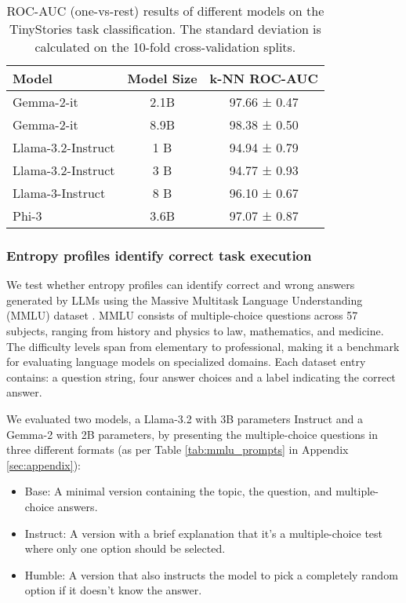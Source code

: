 \begin{table}[ht]
\centering
\caption{ROC-AUC (one-vs-rest) results of different models on the TinyStories task classification. The standard deviation is calculated on the 10-fold cross-validation splits.}
\label{tab:tinystories_results}
\begin{tabular}{l c c}
\toprule
\textbf{Model} & \textbf{Model Size} & \textbf{k-NN ROC-AUC} \\ 
\midrule
Gemma-2-it & 2.1B  & 97.66 ± 0.47 \\  
Gemma-2-it & 8.9B  & 98.38 ± 0.50 \\  
Llama-3.2-Instruct & 1 B  & 94.94 ± 0.79 \\  
Llama-3.2-Instruct & 3 B    & 94.77 ± 0.93 \\  
Llama-3-Instruct   & 8 B    & 96.10 ± 0.67 \\  
Phi-3              & 3.6B  & 97.07 ± 0.87 \\  
\bottomrule
\end{tabular}
\label{tab:tiny-task}
\end{table}


\subsubsection{Entropy profiles identify correct task execution} \label{sec:exp-tm}
We test whether entropy profiles can identify correct and wrong answers generated by LLMs using the Massive Multitask Language Understanding (MMLU) dataset \cite{hendrycks2021measuringmassivemultitasklanguage}. \newline
MMLU consists of multiple-choice questions across 57 subjects, ranging from history and physics to law, mathematics, and medicine. The difficulty levels span from elementary to professional, making it a benchmark for evaluating language models on specialized domains. Each dataset entry contains: a question string, four answer choices and a label indicating the correct answer.

We evaluated two models, a Llama-3.2 with 3B parameters Instruct and a Gemma-2 with 2B parameters, by presenting the multiple-choice questions in three different formats (as per Table \ref{tab:mmlu_prompts} in Appendix \ref{sec:appendix}):
\begin{itemize}
\item Base: A minimal version containing the topic, the question, and multiple-choice answers.
\item Instruct: A version with a brief explanation that it's a multiple-choice test where only one option should be selected.
\item Humble: A version that also instructs the model to pick a completely random option if it doesn't know the answer.
\end{itemize}

